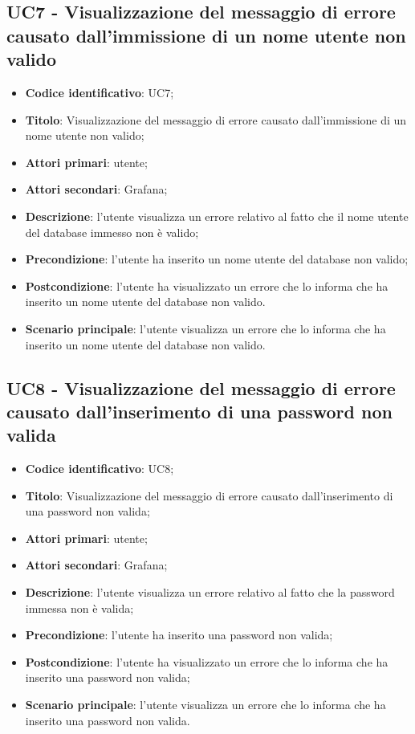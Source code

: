 \subsection{UC7 - Visualizzazione del messaggio di errore causato dall'immissione di un nome utente non valido}
\begin{itemize}
	\item \textbf{Codice identificativo}: UC7;
	\item \textbf{Titolo}: Visualizzazione del messaggio di errore causato dall'immissione di un nome utente non valido;
	\item \textbf{Attori primari}: utente;
	\item \textbf{Attori secondari}: Grafana\glo;
	\item \textbf{Descrizione}: l'utente visualizza un errore relativo al fatto che il nome utente del database immesso non è 		valido;
	\item \textbf{Precondizione}: l'utente ha inserito un nome utente del database non valido;
	\item \textbf{Postcondizione}: l'utente ha visualizzato un errore che lo informa che ha inserito un nome utente del database non 	valido.
	\item \textbf{Scenario principale}: l'utente visualizza un errore che lo informa che ha inserito un nome utente del database non 	valido.
\end{itemize}
		
\subsection{UC8 - Visualizzazione del messaggio di errore causato dall'inserimento di una password non valida}
\begin{itemize}
	\item \textbf{Codice identificativo}: UC8;
	\item \textbf{Titolo}: Visualizzazione del messaggio di errore causato dall'inserimento di una password non valida;
	\item \textbf{Attori primari}: utente;
	\item \textbf{Attori secondari}: Grafana\glo;
	\item \textbf{Descrizione}: l'utente visualizza un errore relativo al fatto che la password immessa non è valida;	
	\item \textbf{Precondizione}: l'utente ha inserito una password non valida;
	\item \textbf{Postcondizione}: l'utente ha visualizzato un errore che lo informa che ha inserito una password non valida;
	\item \textbf{Scenario principale}: l'utente visualizza un errore che lo informa che ha inserito una password non valida.
\end{itemize}




